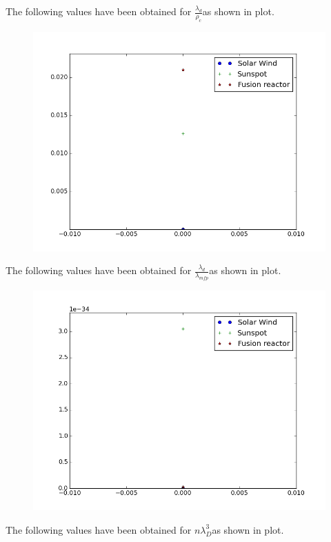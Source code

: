 \documentclass[11pt, a4paper]{article}
\begin{document}
The following values have been obtained for $\frac{\lambda_d}{\rho_c}$as shown in plot.
\begin{figure}[H]
 \centering
 \includegraphics[width = \textwidth]{q1_0.png}
\end{figure}
The following values have been obtained for $\frac{\lambda_d}{\lambda_{mfp}}$as shown in plot.
\begin{figure}[H]
 \centering
 \includegraphics[width = \textwidth]{q1_1.png}
\end{figure}
The following values have been obtained for $n\lambda_D^3$as shown in plot.
\end{document}
